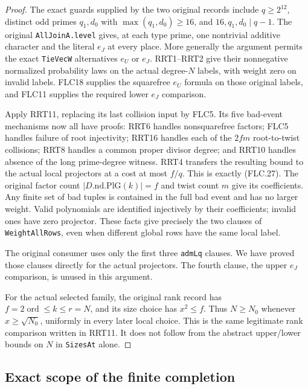 \begin{proof}
The exact guards supplied by the two original records include
$q\ge2^{12}$, distinct odd primes $q_1,d_0$ with
$\max(q_1,d_0)\ge16$, and $16,q_1,d_0\mid q-1$.
The original \texttt{AllJoinA.level} gives, at each type
prime, one nontrivial additive character and the literal
$e_J$ at every place.  More generally the argument permits
the exact \texttt{TieVecW} alternatives $e_U$ or $e_J$.
RRT1--RRT2 give their nonnegative normalized probability
laws on the actual degree-$N$ labels, with weight zero on
invalid labels.  FLC18 supplies the squarefree $e_U$ formula
on those original labels, and FLC11 supplies the required
lower $e_J$ comparison.

Apply RRT11, replacing its last collision input by FLC5.
Its five bad-event mechanisms now all have proofs:
RRT6 handles nonsquarefree factors; FLC5 handles failure of
root injectivity; RRT16 handles each of the $2fm$ root-to-twist
collisions; RRT8 handles a common proper divisor degree;
and RRT10 handles absence of the long prime-degree witness.
RRT4 transfers the resulting bound to the actual local
projectors at a cost at most $f/q$.  This is exactly (FLC.27).
The original factor count $|D.\mathrm{nd}.\mathrm{PlG}(k)|=f$
and twist count $m$ give its coefficients.
Any finite set of bad tuples is contained in the full bad
event and has no larger weight.  Valid polynomials are
identified injectively by their coefficients; invalid ones
have zero projector.  These facts give precisely the two
clauses of \texttt{WeightAllRows}, even when different global
rows have the same local label.

The original consumer 
uses only the first three \texttt{admLq} clauses.
We have proved those clauses directly for the actual
projectors.  The fourth clause, the upper $e_J$ comparison,
is unused in this argument.

For the actual selected family, the original rank record
has $f=2\operatorname{ord}\le k\le r=N$, and its size
choice has $x^2\le f$.  Thus $N\ge N_0$ whenever
$x\ge\sqrt{N_0}$, uniformly in every later local choice.
This is the same legitimate rank comparison written in
RRT11.  It does not follow from the abstract upper/lower
bounds on $N$ in \texttt{SizesAt} alone.
\end{proof}

\subsection{Exact scope of the finite completion}

